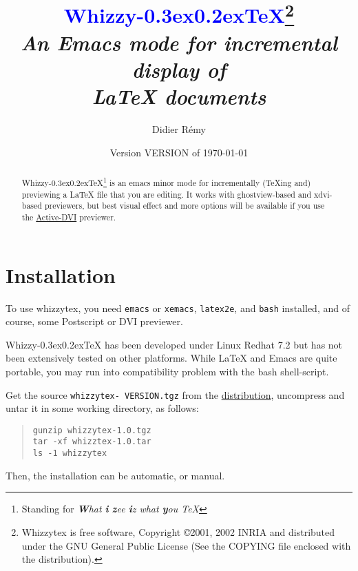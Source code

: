 \documentclass{article}
\makeatletter
\def \whizzy {{Whizzy\kern -0.3ex\raise 0.2ex\hbox{\let \@\relax\TeX}}}
\def \Whizzy{\textbf {\textcolor {blue}{\whizzy}}}
\def \version { {VERSION}}
\makeatother
\begin{document}
\pagestyle {empty}

\author {Didier R{\'e}my}
\date {Version {\version} of \today}
\title {
{\huge \Whizzy\footnote{Whizzytex is free software, 
Copyright \copyright 2001, 2002 INRIA
and distributed under the GNU General Public License
(See the COPYING file enclosed with the distribution).}}
\\[1em]
{\em An {\bfseries Emacs mode} 
for incremental display of \\ 
{\bfseries {\LaTeX} documents}}
}

\maketitle   


\begin{abstract}
\def \B{\textbf}
{\whizzy}\footnote {Standing for {\em {\B W}hat {\B i} {\B z}ee
{\B i}z what {\B y}ou {\expandafter \B \TeX}}} is an emacs minor mode for
incrementally ({\TeX}ing and) previewing 
a {\LaTeX} file that you are editing.
%
It works with ghostview-based and xdvi-based previewers, but best 
visual effect and more options will be available if you use  the
\href{http://pauillac.inria.fr/advi/}{Active-DVI} previewer. 

\end{abstract}

\section {Installation}

To use whizzytex, you need {\tt emacs} or {\tt xemacs}, {\tt latex2e}, and
{\tt bash} installed, and of course, some Postscript or DVI previewer.

{\whizzy} has been developed under Linux Redhat 7.2 but has not been
extensively tested on other platforms. While {\LaTeX} and Emacs are quite
portable, you may run into compatibility problem with the bash
shell-script. 


Get the source 
{\tt whizzytex-\version.tgz} 
from the \href{http://pauillac.inria.fr/whizzytex}{distribution}, 
uncompress and untar it in some working directory, as follows:
\begin{quote}
\begin{verbatim}
gunzip whizzytex-1.0.tgz
tar -xf whizztex-1.0.tar
ls -1 whizzytex 
\end{verbatim}
\end{quote}
Then, the installation can be automatic, or manual.
\end{document}
